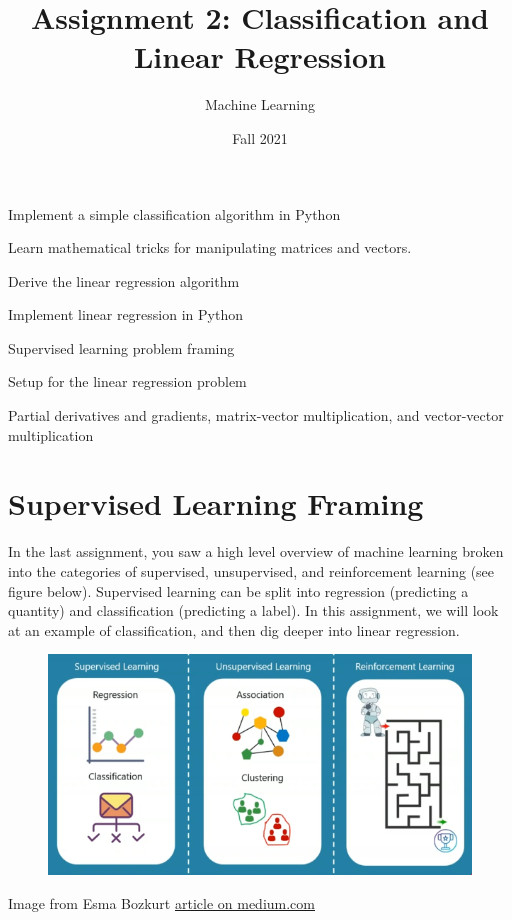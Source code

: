 \documentclass[assignment02_Solutions]{subfiles}
\title{Assignment 2: Classification and Linear Regression}
\author{Machine Learning}
\date{Fall 2021}
\begin{document}
\maketitle
\thispagestyle{firstpage}



\begin{learningobjectives}
\bi
\item Implement a simple classification algorithm in Python
\item Learn mathematical tricks for manipulating matrices and vectors.
\item Derive the linear regression algorithm
\item Implement linear regression in Python
\ei
\end{learningobjectives}

\begin{priorknowledge}
\bi
\item Supervised learning problem framing
\item Setup for the linear regression problem
\item Partial derivatives and gradients, matrix-vector multiplication, and vector-vector multiplication
\ei
\end{priorknowledge}

\section{Supervised Learning Framing}

In the last assignment, you saw a high level overview of machine learning broken into the categories of supervised, unsupervised, and reinforcement learning (see figure below). Supervised learning can be split into regression (predicting a quantity) and classification (predicting a label). In this assignment, we will look at an example of classification, and then dig deeper into linear regression. 

\begin{figure}
\includegraphics[width=0.6\linewidth]{figures/SupervisedUnsupervisedReinforcement}
\centering
\centering
\end{figure}
\begin{center}
Image from Esma Bozkurt \href{https://medium.com/analytics-vidhya/introduction-to-machine-learning-regression-5bbf4ed96f40}{article on medium.com}
\end{center}
\end{document}
